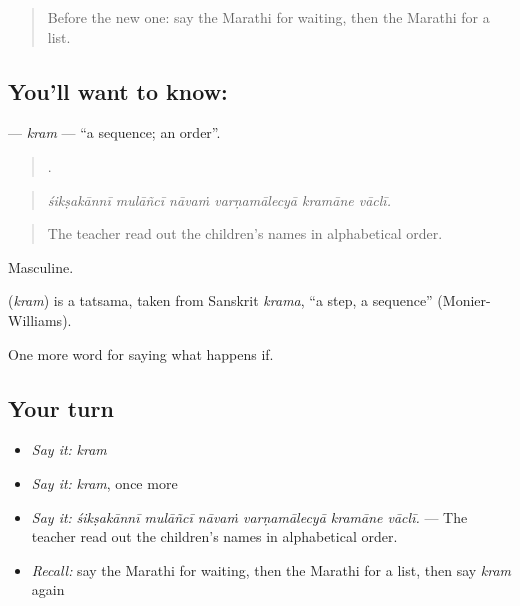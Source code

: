\label{lesson:MR-C551-kram}



\begin{quote}
Before the new one: say the Marathi for waiting, then the Marathi for a list.
\end{quote}

\subsection*{You'll want to know: }
\textbf{} — \emph{kram} — \textquotedblleft{}a sequence; an order\textquotedblright{}.

\begin{quote}
     .
\end{quote}

\begin{quote}
\emph{śikṣakānnī mulāñcī nāvaṁ varṇamālecyā kramāne vāclī.}
\end{quote}

\begin{quote}
The teacher read out the children's names in alphabetical order.
\end{quote}

Masculine.

\begin{cousinweb}
\textbf{} (\emph{kram}) is a tatsama, taken from Sanskrit \emph{krama}, \textquotedblleft{}a step, a sequence\textquotedblright{} (Monier-Williams).
\end{cousinweb}

\begin{grammarlens}[title={What you've built}]
One more word for saying what happens if.
\end{grammarlens}

\subsection*{Your turn}
\begin{itemize}
\raggedright
  \item \emph{Say it:} \emph{kram}
  \item \emph{Say it:} \emph{kram}, once more
  \item \emph{Say it:} \emph{śikṣakānnī mulāñcī nāvaṁ varṇamālecyā kramāne vāclī.} — The teacher read out the children's names in alphabetical order.
  \item \emph{Recall:} say the Marathi for waiting, then the Marathi for a list, then say \emph{kram} again
\end{itemize}

